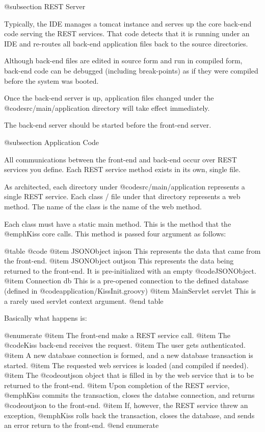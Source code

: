 @subsection REST Server

Typically, the IDE manages a tomcat instance and serves up the core
back-end code serving the REST services.  That code detects that it is
running under an IDE and re-routes all back-end application files back
to the source directories.

Although back-end files are edited in source form and run in compiled
form, back-end code can be debugged (including break-points) as if
they were compiled before the system was booted.

Once the back-end server is up, application files changed under the
@code{src/main/application} directory will take effect immediately.

The back-end server should be started before the front-end server.

@subsection Application Code

All communications between the front-end and back-end occur over REST
services you define.  Each REST service method exists in its own, single
file.

As architected, each directory under @code{src/main/application}
represents a single REST service.  Each class / file under that
directory represents a web method.  The name of the class is the name
of the web method.

Each class must have a static main method.  This is the method that
the @emph{Kiss} core calls.  This method is passed four argument as
follows:

@table @code
@item JSONObject injson
This represents the data that came from the front-end.
@item JSONObject outjson
This represents the data being returned to the front-end.  It is pre-initialized with an empty @code{JSONObject}.
@item Connection db
This is a pre-opened connection to the defined database (defined in @code{application/KissInit.groovy})
@item MainServlet servlet
This is a rarely used servlet context argument.
@end table

Basically what happens is:

@enumerate
@item
The front-end make a REST service call.
@item
The @code{Kiss} back-end receives the request.
@item
The user gets authenticated.
@item
A new database connection is formed, and a new database transaction is started.
@item
The requested web services is loaded (and compiled if needed).
@item
The @code{outjson} object that is filled in by the web service that is to be returned to the front-end.
@item
Upon completion of the REST service, @emph{Kiss} commits the transaction, closes the databse connection, and returns @code{outjson} to the front-end.
@item
If, however, the REST service threw an exception, @emph{Kiss} rolls back the transaction, closes the database, and sends an error return to the front-end.
@end enumerate

